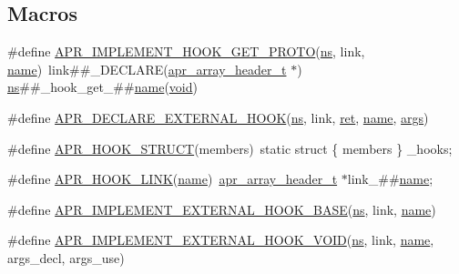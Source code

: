 \subsection*{Macros}
\begin{DoxyCompactItemize}
\item 
\#define \hyperlink{group__APR__Util__Hook_ga832a6d3b73a43b3f7c58c5702ddccce9}{A\+P\+R\+\_\+\+I\+M\+P\+L\+E\+M\+E\+N\+T\+\_\+\+H\+O\+O\+K\+\_\+\+G\+E\+T\+\_\+\+P\+R\+O\+TO}(\hyperlink{group__APR__Util__RC_ga16ebca092e717a050cdb4feb7bb59849}{ns},  link,  \hyperlink{pcre_8txt_a5a15d68aadb41c771fe50a27c400d49b}{name})~link\#\#\+\_\+\+D\+E\+C\+L\+A\+RE(\hyperlink{structapr__array__header__t}{apr\+\_\+array\+\_\+header\+\_\+t} $\ast$) \hyperlink{group__APR__Util__RC_ga16ebca092e717a050cdb4feb7bb59849}{ns}\#\#\+\_\+hook\+\_\+get\+\_\+\#\#\hyperlink{pcre_8txt_a5a15d68aadb41c771fe50a27c400d49b}{name}(\hyperlink{group__MOD__ISAPI_gacd6cdbf73df3d9eed42fa493d9b621a6}{void})
\item 
\#define \hyperlink{group__APR__Util__Hook_ga69298243d3c4ffb4627fd3d04b522f44}{A\+P\+R\+\_\+\+D\+E\+C\+L\+A\+R\+E\+\_\+\+E\+X\+T\+E\+R\+N\+A\+L\+\_\+\+H\+O\+OK}(\hyperlink{group__APR__Util__RC_ga16ebca092e717a050cdb4feb7bb59849}{ns},  link,  \hyperlink{group__APACHE__MPM_ga794c48ec324a4d85a40f38fe264d2a41}{ret},  \hyperlink{pcre_8txt_a5a15d68aadb41c771fe50a27c400d49b}{name},  \hyperlink{group__APR__Util__DBD_ga6b6dfca544bdc17e0e73e3ca56c2363d}{args})
\item 
\#define \hyperlink{group__APR__Util__Hook_gaa936f5a0d1164d301aa157de6023fae5}{A\+P\+R\+\_\+\+H\+O\+O\+K\+\_\+\+S\+T\+R\+U\+CT}(members)~static struct \{ members \} \+\_\+hooks;
\item 
\#define \hyperlink{group__APR__Util__Hook_ga5699f73166bae88b6f6ac0bf7618b0f6}{A\+P\+R\+\_\+\+H\+O\+O\+K\+\_\+\+L\+I\+NK}(\hyperlink{pcre_8txt_a5a15d68aadb41c771fe50a27c400d49b}{name})~\hyperlink{structapr__array__header__t}{apr\+\_\+array\+\_\+header\+\_\+t} $\ast$link\+\_\+\#\#\hyperlink{pcre_8txt_a5a15d68aadb41c771fe50a27c400d49b}{name};
\item 
\#define \hyperlink{group__APR__Util__Hook_ga2500abadaa54b3a9d6ec25ff33a6b0cc}{A\+P\+R\+\_\+\+I\+M\+P\+L\+E\+M\+E\+N\+T\+\_\+\+E\+X\+T\+E\+R\+N\+A\+L\+\_\+\+H\+O\+O\+K\+\_\+\+B\+A\+SE}(\hyperlink{group__APR__Util__RC_ga16ebca092e717a050cdb4feb7bb59849}{ns},  link,  \hyperlink{pcre_8txt_a5a15d68aadb41c771fe50a27c400d49b}{name})
\item 
\#define \hyperlink{group__APR__Util__Hook_ga2d11a43b6431ec568cc1647da4a2079c}{A\+P\+R\+\_\+\+I\+M\+P\+L\+E\+M\+E\+N\+T\+\_\+\+E\+X\+T\+E\+R\+N\+A\+L\+\_\+\+H\+O\+O\+K\+\_\+\+V\+O\+ID}(\hyperlink{group__APR__Util__RC_ga16ebca092e717a050cdb4feb7bb59849}{ns},  link,  \hyperlink{pcre_8txt_a5a15d68aadb41c771fe50a27c400d49b}{name},  args\+\_\+decl,  args\+\_\+use)

\end{DoxyCompactItemize}
